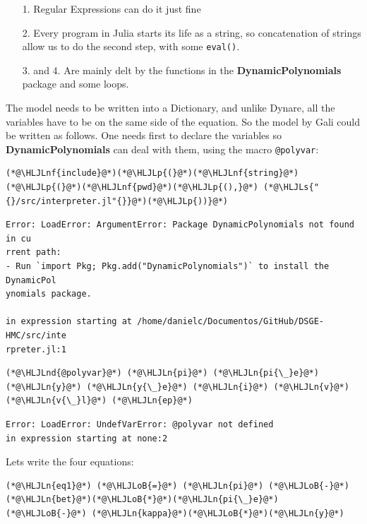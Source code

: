 \documentclass[12pt,a4paper]{article}
\newcommand{\HLJLn}[1]{#1}
\newcommand{\HLJLnd}[1]{\textcolor[RGB]{214,102,97}{#1}}
\newcommand{\HLJLnf}[1]{\textcolor[RGB]{66,102,213}{#1}}
\newcommand{\HLJLs}[1]{\textcolor[RGB]{201,61,57}{#1}}
\newcommand{\HLJLoB}[1]{\textcolor[RGB]{102,102,102}{\textbf{#1}}}
\newcommand{\HLJLp}[1]{#1}
\begin{document}
\begin{itemize}
\item[1. ] Regular Expressions can do it just fine


\item[2. ] Every program in Julia starts its life as a string, so concatenation of strings allow us to do the second step, with some \texttt{eval()}.


\item[3. ] and 4. Are mainly delt by the functions in the \textbf{DynamicPolynomials} package and some loops.

\end{itemize}
The model needs to be written into a Dictionary, and unlike Dynare, all the variables have to be on the same side of the equation. So the model by Gali could be written as follows. One needs first to declare the variables so \textbf{DynamicPolynomials} can deal with them, using the macro \texttt{@polyvar}:


\begin{lstlisting}
(*@\HLJLnf{include}@*)(*@\HLJLp{(}@*)(*@\HLJLnf{string}@*)(*@\HLJLp{(}@*)(*@\HLJLnf{pwd}@*)(*@\HLJLp{(),}@*) (*@\HLJLs{"{}/src/interpreter.jl"{}}@*)(*@\HLJLp{))}@*)
\end{lstlisting}

\begin{lstlisting}
Error: LoadError: ArgumentError: Package DynamicPolynomials not found in cu
rrent path:
- Run `import Pkg; Pkg.add("DynamicPolynomials")` to install the DynamicPol
ynomials package.

in expression starting at /home/danielc/Documentos/GitHub/DSGE-HMC/src/inte
rpreter.jl:1
\end{lstlisting}


\begin{lstlisting}
(*@\HLJLnd{@polyvar}@*) (*@\HLJLn{pi}@*) (*@\HLJLn{pi{\_}e}@*) (*@\HLJLn{y}@*) (*@\HLJLn{y{\_}e}@*) (*@\HLJLn{i}@*) (*@\HLJLn{v}@*) (*@\HLJLn{v{\_}l}@*) (*@\HLJLn{ep}@*)
\end{lstlisting}

\begin{lstlisting}
Error: LoadError: UndefVarError: @polyvar not defined
in expression starting at none:2
\end{lstlisting}


Lets write the four equations:


\begin{lstlisting}
(*@\HLJLn{eq1}@*) (*@\HLJLoB{=}@*) (*@\HLJLn{pi}@*) (*@\HLJLoB{-}@*) (*@\HLJLn{bet}@*)(*@\HLJLoB{*}@*)(*@\HLJLn{pi{\_}e}@*) (*@\HLJLoB{-}@*) (*@\HLJLn{kappa}@*)(*@\HLJLoB{*}@*)(*@\HLJLn{y}@*)
\end{lstlisting}
\end{document}

